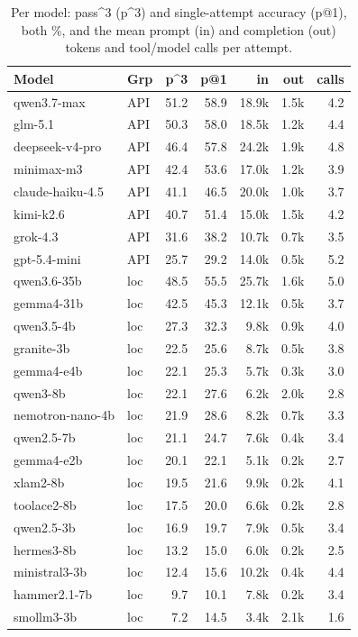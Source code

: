 \begin{table}[h]
  \centering \footnotesize \setlength{\tabcolsep}{4pt}
  \begin{tabular}{llrrrrr}
    \toprule
    Model & Grp & p\textasciicircum{}3 & p@1 & in & out & calls \\
    \midrule
    qwen3.7-max & API & 51.2 & 58.9 & 18.9k & 1.5k & 4.2 \\
    glm-5.1 & API & 50.3 & 58.0 & 18.5k & 1.2k & 4.4 \\
    deepseek-v4-pro & API & 46.4 & 57.8 & 24.2k & 1.9k & 4.8 \\
    minimax-m3 & API & 42.4 & 53.6 & 17.0k & 1.2k & 3.9 \\
    claude-haiku-4.5 & API & 41.1 & 46.5 & 20.0k & 1.0k & 3.7 \\
    kimi-k2.6 & API & 40.7 & 51.4 & 15.0k & 1.5k & 4.2 \\
    grok-4.3 & API & 31.6 & 38.2 & 10.7k & 0.7k & 3.5 \\
    gpt-5.4-mini & API & 25.7 & 29.2 & 14.0k & 0.5k & 5.2 \\
    \midrule
    qwen3.6-35b & loc & 48.5 & 55.5 & 25.7k & 1.6k & 5.0 \\
    gemma4-31b & loc & 42.5 & 45.3 & 12.1k & 0.5k & 3.7 \\
    qwen3.5-4b & loc & 27.3 & 32.3 & 9.8k & 0.9k & 4.0 \\
    granite-3b & loc & 22.5 & 25.6 & 8.7k & 0.5k & 3.8 \\
    gemma4-e4b & loc & 22.1 & 25.3 & 5.7k & 0.3k & 3.0 \\
    qwen3-8b & loc & 22.1 & 27.6 & 6.2k & 2.0k & 2.8 \\
    nemotron-nano-4b & loc & 21.9 & 28.6 & 8.2k & 0.7k & 3.3 \\
    qwen2.5-7b & loc & 21.1 & 24.7 & 7.6k & 0.4k & 3.4 \\
    gemma4-e2b & loc & 20.1 & 22.1 & 5.1k & 0.2k & 2.7 \\
    xlam2-8b & loc & 19.5 & 21.6 & 9.9k & 0.2k & 4.1 \\
    toolace2-8b & loc & 17.5 & 20.0 & 6.6k & 0.2k & 2.8 \\
    qwen2.5-3b & loc & 16.9 & 19.7 & 7.9k & 0.5k & 3.4 \\
    hermes3-8b & loc & 13.2 & 15.0 & 6.0k & 0.2k & 2.5 \\
    ministral3-3b & loc & 12.4 & 15.6 & 10.2k & 0.4k & 4.4 \\
    hammer2.1-7b & loc & 9.7 & 10.1 & 7.8k & 0.2k & 3.4 \\
    smollm3-3b & loc & 7.2 & 14.5 & 3.4k & 2.1k & 1.6 \\
    \bottomrule
  \end{tabular}
  \caption{Per model: pass\textasciicircum{}3 (p\textasciicircum{}3) and
    single-attempt accuracy (p@1), both \%, and the mean prompt (in) and
    completion (out) tokens and tool/model calls per attempt.}
  \label{tab:tech}
\end{table}

